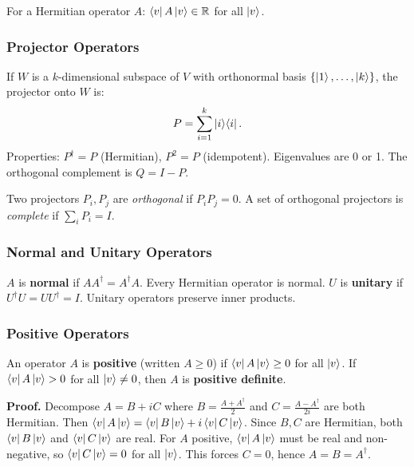 \documentclass[10pt,a4paper]{article}
\begin{document}
\begin{tcolorbox}[propstyle, title={Property: Hermitian Expectation Values}]
For a Hermitian operator $A$: $\bra{v}A\ket{v}\in\mathbb{R}$ for all $\ket{v}$.
\end{tcolorbox}

\subsubsection*{Projector Operators}

\begin{tcolorbox}[defstyle, title={Definition: Projector}]
If $W$ is a $k$-dimensional subspace of $V$ with orthonormal basis $\{\ket{1},\dots,\ket{k}\}$, the projector onto $W$ is:
\[
P = \sum_{i=1}^{k}\ket{i}\!\bra{i}.
\]
Properties: $P^\dagger=P$ (Hermitian), $P^2=P$ (idempotent). Eigenvalues are 0 or 1. The orthogonal complement is $Q=I-P$.
\end{tcolorbox}

Two projectors $P_i,P_j$ are \emph{orthogonal} if $P_iP_j=0$. A set of orthogonal projectors is \emph{complete} if $\sum_i P_i=I$.

\subsubsection*{Normal and Unitary Operators}

\begin{tcolorbox}[defstyle, title={Definition: Normal and Unitary Operators}]
$A$ is \textbf{normal} if $AA^\dagger=A^\dagger A$. Every Hermitian operator is normal. $U$ is \textbf{unitary} if $U^\dagger U=UU^\dagger=I$. Unitary operators preserve inner products.
\end{tcolorbox}

\subsubsection*{Positive Operators}

\begin{tcolorbox}[defstyle, title={Definition: Positive Operator}]
An operator $A$ is \textbf{positive} (written $A\ge 0$) if $\bra{v}A\ket{v}\ge 0$ for all $\ket{v}$. If $\bra{v}A\ket{v}>0$ for all $\ket{v}\neq 0$, then $A$ is \textbf{positive definite}.
\end{tcolorbox}

\begin{tcolorbox}[propstyle, title={Theorem: A Positive Operator Is Hermitian}]
\textbf{Proof.} Decompose $A=B+iC$ where $B=\frac{A+A^\dagger}{2}$ and $C=\frac{A-A^\dagger}{2i}$ are both Hermitian. Then $\bra{v}A\ket{v}=\bra{v}B\ket{v}+i\bra{v}C\ket{v}$. Since $B,C$ are Hermitian, both $\bra{v}B\ket{v}$ and $\bra{v}C\ket{v}$ are real. For $A$ positive, $\bra{v}A\ket{v}$ must be real and non-negative, so $\bra{v}C\ket{v}=0$ for all $\ket{v}$. This forces $C=0$, hence $A=B=A^\dagger$.
\end{tcolorbox}
\end{document}
